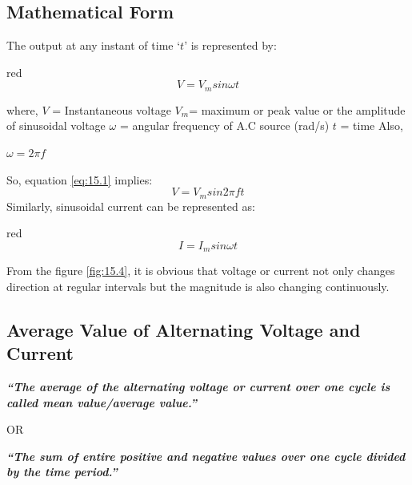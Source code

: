 \subsection*{Mathematical Form}
The output at any instant of time ‘$t$’ is represented by:
\begin{mybox}{red}{}
\begin{equation}\label{eq:15.1}
    V = V_{m} sin \omega t
\end{equation}
\end{mybox}
\noindent where,
\newline
$V$ = Instantaneous voltage
\newline
$V_{m}$= maximum or peak value or the amplitude of sinusoidal voltage
\newline
$\omega$ = angular frequency of A.C source (rad/s)
\newline
$t$ = time
\newline
Also,
\begin{center}
    $ \omega = 2 \pi f $
\end{center}
So, equation \ref{eq:15.1} implies:
\begin{equation}\label{eq:15.2}
    V = V_{m} sin 2 \pi f t
\end{equation}
Similarly, sinusoidal current can be represented as:
\begin{mybox}{red}{}
\begin{equation}\label{eq:15.3}
    I = I_{m} sin \omega t
\end{equation}
\end{mybox}
\noindent From the figure \ref{fig:15.4}, it is obvious that voltage or current
not only changes direction at regular intervals but the magnitude is
also changing continuously.

\subsection{Average Value of Alternating Voltage and Current}
\textit{\textbf{“The average of the alternating voltage or current over
one cycle is called mean value/average value.”}}
\begin{center}
    OR
\end{center}
\textit{\textbf{“The sum of entire positive and negative values over
one cycle divided by the time period.”}}  

